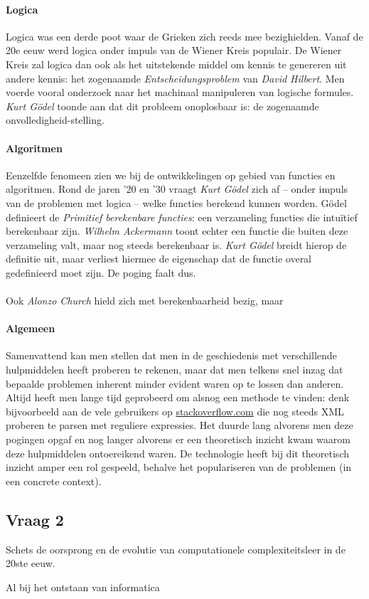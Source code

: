 \documentclass[../main.tex]{subfiles}
\begin{document}
\begin{solution}
\paragraph{Logica}
Logica was een derde poot waar de Grieken zich reeds mee bezighielden. Vanaf de
20e eeuw werd logica onder impuls van de Wiener Kreis populair. De Wiener Kreis
zal logica dan ook als het uitstekende middel om kennis te genereren uit andere kennis:
het zogenaamde \emph{Entscheidungsproblem} van \emph{David Hilbert}.
Men voerde vooral onderzoek naar het machinaal manipuleren van logische formules.
\emph{Kurt G\"odel} toonde aan dat dit probleem onoplosbaar is: de zogenaamde
onvolledigheid-stelling.

\paragraph{Algoritmen}
Eenzelfde fenomeen zien we bij de ontwikkelingen op gebied van functies en algoritmen.
Rond de jaren '20 en '30 vraagt \emph{Kurt G\"odel} zich af -- onder impuls
van de problemen met logica -- welke functies berekend kunnen worden. G\"odel
definieert de \emph{Primitief berekenbare functies}: een verzameling functies
die intu\"itief berekenbaar zijn. \emph{Wilhelm Ackermann} toont echter een functie
die buiten deze verzameling valt, maar nog steeds berekenbaar is. \emph{Kurt G\"odel}
breidt hierop de definitie uit, maar verliest hiermee de eigenschap dat de functie
overal gedefinieerd moet zijn. De poging faalt dus.

\paragraph{}
Ook \emph{Alonzo Church} hield zich met berekenbaarheid bezig, maar 

\paragraph{Algemeen}
Samenvattend kan men stellen dat men in de geschiedenis met verschillende hulpmiddelen
heeft proberen te rekenen, maar dat men telkens snel inzag dat bepaalde problemen
inherent minder evident waren op te lossen dan anderen. Altijd heeft men lange
tijd geprobeerd om alsnog een methode te vinden: denk bijvoorbeeld aan de vele
gebruikers op \url{stackoverflow.com} die nog steeds XML proberen te parsen met
reguliere expressies. Het duurde lang alvorens men deze pogingen opgaf en nog
langer alvorens er een theoretisch inzicht kwam waarom deze hulpmiddelen ontoereikend
waren. De technologie heeft bij dit theoretisch inzicht amper een rol gespeeld,
behalve het populariseren van de problemen (in een concrete context).
\end{solution}


\subsection{Vraag 2}
\begin{question}
Schets de oorsprong en de evolutie van computationele complexiteitsleer in de 20ste
eeuw.
\end{question}
\begin{solution}
Al bij het ontstaan van informatica
\end{solution}
\end{document}
